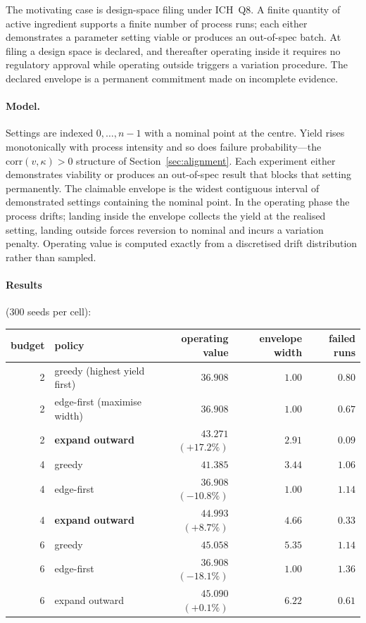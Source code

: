 The motivating case is design-space filing under ICH~Q8. A finite quantity of
active ingredient supports a finite number of process runs; each either
demonstrates a parameter setting viable or produces an out-of-spec batch. At filing
a design space is declared, and thereafter operating inside it requires no
regulatory approval while operating outside triggers a variation procedure. The
declared envelope is a permanent commitment made on incomplete evidence.

\paragraph{Model.} Settings are indexed $0,\dots,n-1$ with a nominal point at the
centre. Yield rises monotonically with process intensity and so does failure
probability---the $\mathrm{corr}(v,\kappa)>0$ structure of
Section~\ref{sec:alignment}. Each experiment either demonstrates viability or
produces an out-of-spec result that blocks that setting permanently. The claimable
envelope is the widest contiguous interval of demonstrated settings containing the
nominal point. In the operating phase the process drifts; landing inside the
envelope collects the yield at the realised setting, landing outside forces
reversion to nominal and incurs a variation penalty. Operating value is computed
exactly from a discretised drift distribution rather than sampled.

\paragraph{Results} (300 seeds per cell):

\begin{center}
\begin{tabular}{rlrrr}
\toprule
budget & policy & operating value & envelope width & failed runs \\
\midrule
2 & greedy (highest yield first) & $36.908$ & $\mathbf{1.00}$ & $0.80$ \\
2 & edge-first (maximise width) & $36.908$ & $\mathbf{1.00}$ & $0.67$ \\
2 & \textbf{expand outward} & $\mathbf{43.271}$ $(+17.2\%)$ & $\mathbf{2.91}$ & $0.09$ \\[2pt]
4 & greedy & $41.385$ & $3.44$ & $1.06$ \\
4 & edge-first & $36.908$ $(-10.8\%)$ & $\mathbf{1.00}$ & $1.14$ \\
4 & \textbf{expand outward} & $\mathbf{44.993}$ $(+8.7\%)$ & $\mathbf{4.66}$ & $0.33$ \\[2pt]
6 & greedy & $45.058$ & $5.35$ & $1.14$ \\
6 & edge-first & $36.908$ $(-18.1\%)$ & $\mathbf{1.00}$ & $1.36$ \\
6 & expand outward & $45.090$ $(+0.1\%)$ & $6.22$ & $0.61$ \\
\bottomrule
\end{tabular}
\end{center}

